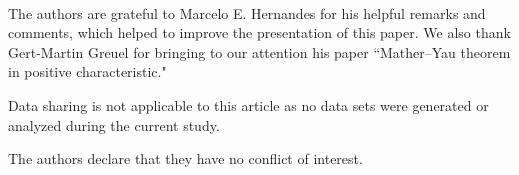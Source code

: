 \documentclass[12pt,letterpaper]{amsart}
\begin{document}
\vspace{2cm}
\\
 The authors are grateful to Marcelo E. Hernandes for his helpful remarks and comments, which helped to improve the presentation of this paper. We also thank Gert-Martin Greuel for bringing to our attention his paper ``Mather–Yau theorem in positive characteristic."


\vspace{1cm}

Data sharing is not applicable to this article as no data sets were generated or analyzed during the current study.
\vspace{1cm}

 The authors declare that they have no conflict of interest.
\end{document}
